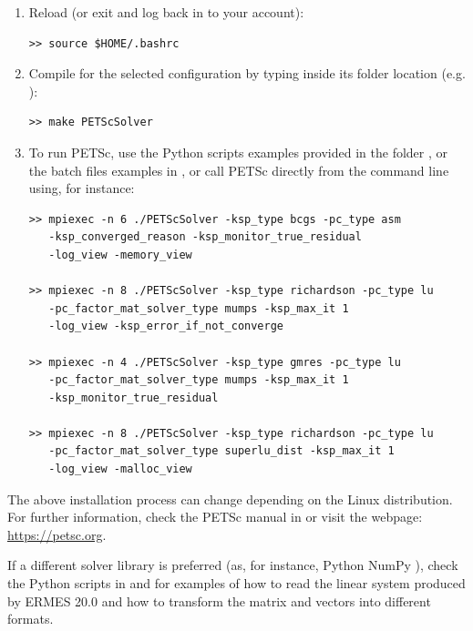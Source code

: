 \begin{enumerate}
\item Reload  (or exit and log back in to your account):

\begin{small}\begin{lstlisting}
>> source $HOME/.bashrc
\end{lstlisting}\end{small}  	

\item Compile  for the selected configuration by typing inside its folder location (e.g. ):

\begin{small}\begin{lstlisting}
>> make PETScSolver
\end{lstlisting}\end{small}  

\item To run PETSc, use the Python scripts examples provided in the folder , or the batch files examples in , or call PETSc directly from the command line using, for instance:

\begin{small}\begin{lstlisting}
>> mpiexec -n 6 ./PETScSolver -ksp_type bcgs -pc_type asm 
   -ksp_converged_reason -ksp_monitor_true_residual 
   -log_view -memory_view

>> mpiexec -n 8 ./PETScSolver -ksp_type richardson -pc_type lu 
   -pc_factor_mat_solver_type mumps -ksp_max_it 1 
   -log_view -ksp_error_if_not_converge

>> mpiexec -n 4 ./PETScSolver -ksp_type gmres -pc_type lu 
   -pc_factor_mat_solver_type mumps -ksp_max_it 1 
   -ksp_monitor_true_residual

>> mpiexec -n 8 ./PETScSolver -ksp_type richardson -pc_type lu 
   -pc_factor_mat_solver_type superlu_dist -ksp_max_it 1 
   -log_view -malloc_view
\end{lstlisting}\end{small}  	
\end{enumerate}
The above installation process can change depending on the Linux distribution. For further information, check the PETSc manual in  or visit the webpage: \url{https://petsc.org}. 

If a different solver library is preferred (as, for instance, Python NumPy \cite{NumPyWeb}), check the Python scripts in  and  for examples of how to read the linear system produced by ERMES 20.0 and how to transform the matrix and vectors into different formats.
